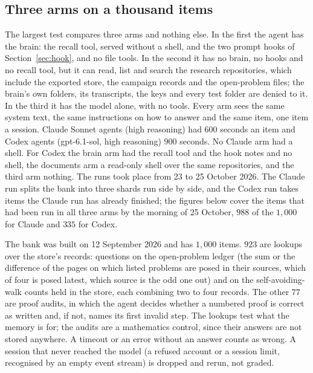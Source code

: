 \subsection{Three arms on a thousand items}\label{subsec:threearm}
The largest test compares three arms and nothing else. In the first the agent has the brain: the recall tool, served without a shell, and the two prompt hooks of Section~\ref{sec:hook}, and no file tools. In the second it has no brain, no hooks and no recall tool, but it can read, list and search the research repositories, which include the exported store, the campaign records and the open-problem files; the brain's own folders, its transcripts, the keys and every test folder are denied to it. In the third it has the model alone, with no tools. Every arm sees the same system text, the same instructions on how to answer and the same item, one item a session. Claude Sonnet agents (high reasoning) had $600$ seconds an item and Codex agents (gpt-6.1-sol, high reasoning) $900$ seconds. No Claude arm had a shell. For Codex the brain arm had the recall tool and the hook notes and no shell, the documents arm a read-only shell over the same repositories, and the third arm nothing. The runs took place from 23 to 25 October 2026. The Claude run splits the bank into three shards run side by side, and the Codex run takes items the Claude run has already finished; the figures below cover the items that had been run in all three arms by the morning of 25 October, $988$ of the $1{,}000$ for Claude and $335$ for Codex.

The bank was built on 12 September 2026 and has $1{,}000$ items. $923$ are lookups over the store's records: questions on the open-problem ledger (the sum or the difference of the pages on which listed problems are posed in their sources, which of four is posed latest, which source is the odd one out) and on the self-avoiding-walk counts held in the store, each combining two to four records. The other $77$ are proof audits, in which the agent decides whether a numbered proof is correct as written and, if not, names its first invalid step. The lookups test what the memory is for; the audits are a mathematics control, since their answers are not stored anywhere. A timeout or an error without an answer counts as wrong. A session that never reached the model (a refused account or a session limit, recognised by an empty event stream) is dropped and rerun, not graded.

